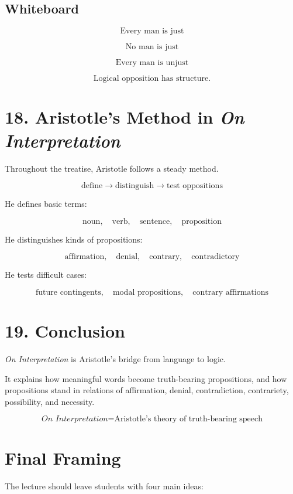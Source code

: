 \documentclass[12pt]{article}
\begin{document}
\subsection*{Whiteboard}

\[
\text{Every man is just}
\]

\[
\text{No man is just}
\]

\[
\text{Every man is unjust}
\]

\[
\boxed{
\text{Logical opposition has structure.}
}
\]

\section*{18. Aristotle's Method in \textit{On Interpretation}}

Throughout the treatise, Aristotle follows a steady method.

\[
\boxed{
\text{define} \rightarrow \text{distinguish} \rightarrow \text{test oppositions}
}
\]

He defines basic terms:

\[
\text{noun}, \quad \text{verb}, \quad \text{sentence}, \quad \text{proposition}
\]

He distinguishes kinds of propositions:

\[
\text{affirmation}, \quad \text{denial}, \quad \text{contrary}, \quad \text{contradictory}
\]

He tests difficult cases:

\[
\text{future contingents}, \quad \text{modal propositions}, \quad \text{contrary affirmations}
\]

\section*{19. Conclusion}

\textit{On Interpretation} is Aristotle's bridge from language to logic.

It explains how meaningful words become truth-bearing propositions, and how
propositions stand in relations of affirmation, denial, contradiction,
contrariety, possibility, and necessity.

\[
\boxed{
\textit{On Interpretation} = \text{Aristotle's theory of truth-bearing speech}
}
\]

\section*{Final Framing}

The lecture should leave students with four main ideas:
\end{document}
